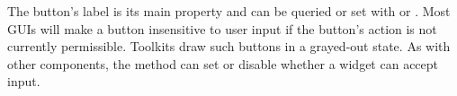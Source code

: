 The button's label is its main property and can be queried or set with
 or .  Most
GUIs will make a button insensitive to user input if the button's
action is not currently permissible. Toolkits draw such buttons in a
grayed-out state. As with other components, the  method can set
or disable whether a widget can accept input.













